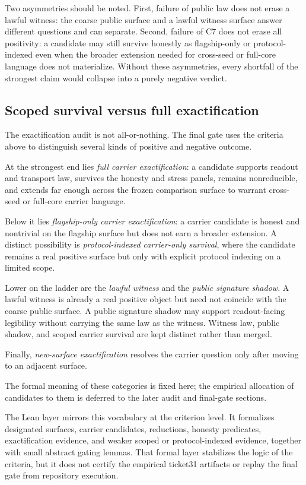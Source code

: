 \documentclass[11pt]{article}
\theoremstyle{definition}
\begin{document}
Two asymmetries should be noted. First, failure of public law does not erase a lawful
witness: the coarse public surface and a lawful witness surface answer different
questions and can separate. Second, failure of C7 does not erase all positivity: a
candidate may still survive honestly as flagship-only or protocol-indexed even when
the broader extension needed for cross-seed or full-core language does not materialize.
Without these asymmetries, every shortfall of the strongest claim would collapse into
a purely negative verdict.

\subsection{Scoped survival versus full exactification}

The exactification audit is not all-or-nothing. The final gate uses the criteria above
to distinguish several kinds of positive and negative outcome.

At the strongest end lies \emph{full carrier exactification}: a candidate supports
readout and transport law, survives the honesty and stress panels, remains
nonreducible, and extends far enough across the frozen comparison surface to warrant
cross-seed or full-core carrier language.

Below it lies \emph{flagship-only carrier exactification}: a carrier candidate is
honest and nontrivial on the flagship surface but does not earn a broader extension. A
distinct possibility is \emph{protocol-indexed carrier-only survival}, where the
candidate remains a real positive surface but only with explicit protocol indexing on
a limited scope.

Lower on the ladder are the \emph{lawful witness} and the \emph{public signature
shadow}. A lawful witness is already a real positive object but need not coincide with
the coarse public surface. A public signature shadow may support readout-facing
legibility without carrying the same law as the witness. Witness law, public shadow,
and scoped carrier survival are kept distinct rather than merged.

Finally, \emph{new-surface exactification} resolves the carrier question only after
moving to an adjacent surface.

The formal meaning of these categories is fixed here; the empirical allocation of
candidates to them is deferred to the later audit and final-gate sections.

The Lean layer mirrors this vocabulary at the criterion level. It formalizes designated
surfaces, carrier candidates, reductions, honesty predicates, exactification evidence,
and weaker scoped or protocol-indexed evidence, together with small abstract gating
lemmas. That formal layer stabilizes the logic of the criteria, but it does not certify
the empirical ticket31 artifacts or replay the final gate from repository execution.
\end{document}
